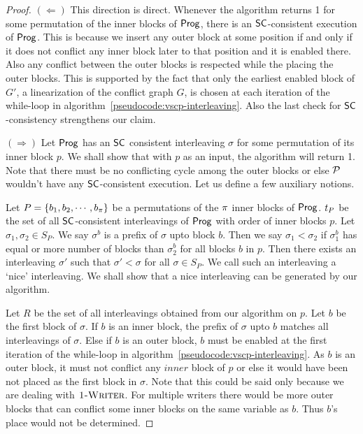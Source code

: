 \begin{proof}
$(\Leftarrow)$ This direction is direct. Whenever the algorithm returns 1 for some permutation of the inner blocks of $\mathsf{Prog}$, there is an $\mathsf{SC}$-consistent execution of $\mathsf{Prog}$. This is because we insert any outer block at some position if and only if it does not conflict any inner block later to that position and it is enabled there. Also any conflict between the outer blocks is respected while the placing the outer blocks. This is supported by the fact that only the earliest enabled block of $G'$, a linearization of the conflict graph $G$, is chosen at each iteration of the while-loop in algorithm~\ref{pseudocode:vscp-interleaving}. Also the last check for $\mathsf{SC}$-consistency strengthens our claim.

 $(\Rightarrow)$ Let $\mathsf{Prog}$ has an $\mathsf{SC}$ consistent interleaving $\sigma$  for some permutation of its inner block $p$. We shall show that with $p$ as an input, the algorithm will return 1. Note that there must be no conflicting cycle among the outer blocks or else ${\mathcal P}$ wouldn't have any $\mathsf{SC}$-consistent execution. Let us define a few auxiliary notions. 
 
 Let $P=\{b_1,b_2,\cdots,b_{\pi}\}$ be a permutations of the $\pi$ inner blocks of $\mathsf{Prog}$. $t_P$ be the set of all $\mathsf{SC}$-consistent interleavings of $\mathsf{Prog}$ with order of inner blocks $p$. 
 Let $\sigma_1,\sigma_2\in S_P$. We say $\sigma^b$ is a prefix of $\sigma$ upto block $b$. Then we say $\sigma_1<\sigma_2$ if $\sigma_1^{b}$ has equal or more number of blocks than $\sigma_2^{b}$ for all blocks $b$ in $p$. Then there exists an interleaving $\sigma'$ such that $\sigma'<\sigma$ for all $\sigma\in S_P$. We call such an interleaving a `nice' interleaving. We shall show that a nice interleaving can be generated by our algorithm. 

 Let $R$ be the set of all interleavings obtained from our algorithm on $p$. 
Let $b$ be the first block of $\sigma$. If $b$ is an inner block, the prefix of $\sigma$ upto $b$ matches all interleavings of $\sigma$. Else if $b$ is an outer block, $b$ must be enabled at the first iteration of the while-loop in algorithm~\ref{pseudocode:vscp-interleaving}. As $b$ is an outer block, it must not conflict any $inner$ block of $p$ or else it would have been not placed as the first block in $\sigma$. Note that this could be said only because we are dealing with $\textsc{1-Writer}$. For multiple writers there would be more outer blocks that can conflict some inner blocks on the same variable as $b$. Thus $b$'s place would not be determined. 


\end{proof}
